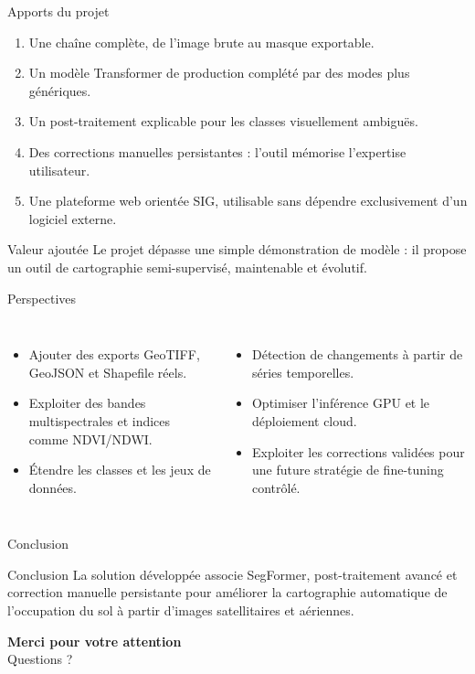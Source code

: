 \documentclass[10pt,aspectratio=169]{beamer}
\begin{document}
\begin{frame}{Apports du projet}
  \begin{enumerate}
    \item Une chaîne complète, de l'image brute au masque exportable.
    \item Un modèle Transformer de production complété par des modes plus génériques.
    \item Un post-traitement explicable pour les classes visuellement ambiguës.
    \item Des corrections manuelles persistantes : l'outil mémorise l'expertise utilisateur.
    \item Une plateforme web orientée SIG, utilisable sans dépendre exclusivement d'un logiciel externe.
  \end{enumerate}
  \vspace{0.25cm}
  \begin{block}{Valeur ajoutée}
    Le projet dépasse une simple démonstration de modèle : il propose un outil de cartographie semi-supervisé, maintenable et évolutif.
  \end{block}
\end{frame}

\begin{frame}{Perspectives}
  \begin{columns}[T]
      \begin{itemize}
        \item Ajouter des exports GeoTIFF, GeoJSON et Shapefile réels.
        \item Exploiter des bandes multispectrales et indices comme NDVI/NDWI.
        \item Étendre les classes et les jeux de données.
      \end{itemize}
      \begin{itemize}
        \item Détection de changements à partir de séries temporelles.
        \item Optimiser l'inférence GPU et le déploiement cloud.
        \item Exploiter les corrections validées pour une future stratégie de fine-tuning contrôlé.
      \end{itemize}
  \end{columns}
\end{frame}

\begin{frame}{Conclusion}
  \begin{block}{Conclusion}
    La solution développée associe SegFormer, post-traitement avancé et correction manuelle persistante pour améliorer la cartographie automatique de l'occupation du sol à partir d'images satellitaires et aériennes.
  \end{block}
  \vfill
  \centering
  {\Large\color{PfaDark}\textbf{Merci pour votre attention}}\\[0.35cm]
  \large Questions ?
\end{frame}
\end{document}
